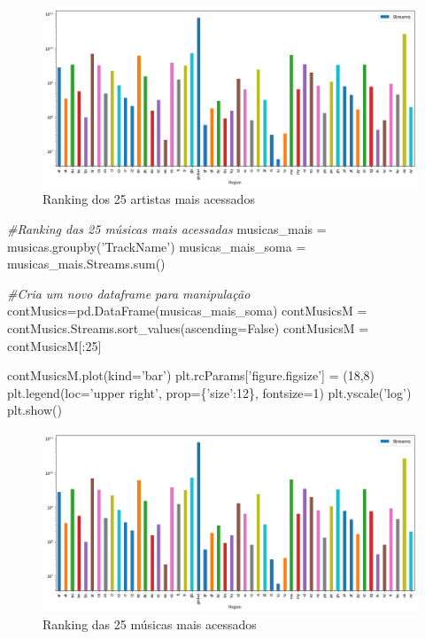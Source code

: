 \documentclass[11pt]{article}
\makeatletter
\def\maxwidth{\ifdim\Gin@nat@width>\linewidth\linewidth
    \else\Gin@nat@width\fi}
\let\Oldincludegraphics\includegraphics
\renewcommand{\includegraphics}[1]{\Oldincludegraphics[width=.8\maxwidth]{#1}}
\newenvironment{Shaded}{}{}
\newcommand{\DecValTok}[1]{\textcolor[rgb]{0.25,0.63,0.44}{{#1}}}
\newcommand{\StringTok}[1]{\textcolor[rgb]{0.25,0.44,0.63}{{#1}}}
\newcommand{\CommentTok}[1]{\textcolor[rgb]{0.38,0.63,0.69}{\textit{{#1}}}}
\newcommand{\NormalTok}[1]{{#1}}
\newcommand{\VariableTok}[1]{\textcolor[rgb]{0.10,0.09,0.49}{{#1}}}
\newcommand{\OperatorTok}[1]{\textcolor[rgb]{0.40,0.40,0.40}{{#1}}}
\newcommand{\BuiltInTok}[1]{{#1}}
\makeatother
\begin{document}
\begin{figure}
\centering
\includegraphics{output_8_0.png}
\caption{Ranking dos 25 artistas mais acessados}
\end{figure}

\begin{Shaded}
\begin{Highlighting}[]

\CommentTok{#Ranking das 25 músicas mais acessadas}
\NormalTok{musicas_mais }\OperatorTok{=}\NormalTok{ musicas.groupby(}\StringTok{'TrackName'}\NormalTok{)}
\NormalTok{musicas_mais_soma }\OperatorTok{=}\NormalTok{ musicas_mais.Streams.}\BuiltInTok{sum}\NormalTok{()}

\CommentTok{#Cria um novo dataframe para manipulação}
\NormalTok{contMusics}\OperatorTok{=}\NormalTok{pd.DataFrame(musicas_mais_soma)}
\NormalTok{contMusicsM }\OperatorTok{=}\NormalTok{ contMusics.Streams.sort_values(ascending}\OperatorTok{=}\VariableTok{False}\NormalTok{)}
\NormalTok{contMusicsM }\OperatorTok{=}\NormalTok{ contMusicsM[:}\DecValTok{25}\NormalTok{]}

\NormalTok{contMusicsM.plot(kind}\OperatorTok{=}\StringTok{'bar'}\NormalTok{)}
\NormalTok{plt.rcParams[}\StringTok{'figure.figsize'}\NormalTok{] }\OperatorTok{=}\NormalTok{ (}\DecValTok{18}\NormalTok{,}\DecValTok{8}\NormalTok{)}
\NormalTok{plt.legend(loc}\OperatorTok{=}\StringTok{'upper right'}\NormalTok{, prop}\OperatorTok{=}\NormalTok{\{}\StringTok{'size'}\NormalTok{:}\DecValTok{12}\NormalTok{\}, fontsize}\OperatorTok{=}\DecValTok{1}\NormalTok{)}
\NormalTok{plt.yscale(}\StringTok{'log'}\NormalTok{)}
\NormalTok{plt.show()}
\end{Highlighting}
\end{Shaded}

\begin{figure}
\centering
\includegraphics{output_8_0.png}
\caption{Ranking das 25 músicas mais acessados}
\end{figure}
\end{document}
